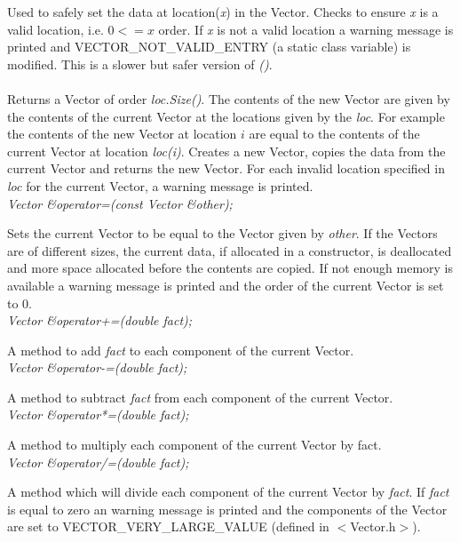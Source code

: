 Used to safely set the data at location({\em x}) in the Vector. Checks
to ensure {\em x} is a valid location, i.e. $0 <= x $ order. If {\em
x} is not a valid location a warning message is printed and
VECTOR\_NOT\_VALID\_ENTRY (a static class variable) is modified. This
is a slower but safer version of {\em ()}.\\ 

\\ 
Returns a Vector of order {\em loc.Size()}. The contents of the new
Vector are given by the contents of the current Vector at the
locations given by the {\em loc}. For example the contents of the new
Vector at location $i$ are equal to the contents of the current Vector
at location {\em loc(i)}. Creates a new Vector, copies the data from
the current Vector and returns the new Vector. For each invalid
location specified in {\em loc} for the current Vector, a warning
message is printed.\\ 

{\em Vector \&operator=(const Vector \&other);}

Sets the current Vector to be equal to the Vector given by {\em
other}. If the Vectors are of different sizes, the current data, if
allocated in a constructor, is deallocated and more space allocated
before the contents are copied. If not enough memory is available a
warning message is printed and the order of the current Vector is set
to $0$.\\ 

{\em  Vector \&operator+=(double fact);} 

A method to add {\em fact} to each component of the current Vector. \\

{\em Vector \&operator-=(double fact);} 

A method to subtract {\em fact} from each component of the current Vector. \\

{\em Vector \&operator*=(double fact);} 

A method to multiply each component of the current Vector by fact. \\

{\em Vector \&operator/=(double fact); } 

A method which will divide each component of the current Vector by
{\em fact}. If {\em fact} is equal to zero an warning message is printed
and the components of the Vector are set to VECTOR\_VERY\_LARGE\_VALUE
(defined in $<$Vector.h$>$). \\

